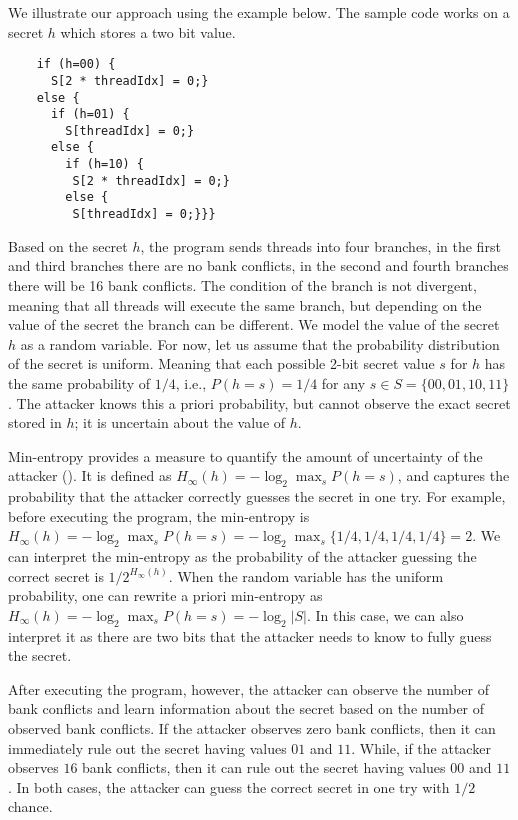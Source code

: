 We illustrate our approach using the example below.
%
The sample code works on a secret $h$ which stores a two bit value.
\begin{lstlisting}
    if (h=00) {
      S[2 * threadIdx] = 0;} 
    else {
      if (h=01) {
        S[threadIdx] = 0;}
      else {
        if (h=10) {
         S[2 * threadIdx] = 0;}
        else {
         S[threadIdx] = 0;}}}
\end{lstlisting}
Based on the secret $h$, the program sends threads into four branches, in the first and third branches there are no bank conflicts, in the second and fourth branches there will be 16 bank conflicts.
%
The condition of the branch is not divergent, meaning that all threads will execute the same branch, but depending on the value of the secret the branch can be different.
%
We model the value of the secret $h$ as a random variable.
%
For now, let us assume that the probability distribution of the secret is uniform.
%
Meaning that each possible 2-bit secret value $s$ for $h$ has the same probability of $1/4$, i.e., $P(h=s)= 1/4$ for any $s\in S=\{00,01,10,11\}$.
%
The attacker knows this a priori probability, but cannot 
observe the exact secret stored in $h$; it is uncertain about the value of $h$.
%

Min-entropy provides a measure to quantify the amount of  uncertainty of the attacker (\cite{min-entropy}).
%
It is defined as 
$H_\infty(h)=-\log_2\max_s P(h=s)$,
and captures the probability that the attacker correctly guesses the secret in one try.
%
For example, before executing the program, the min-entropy is $H_\infty(h)=-\log_2\max_s P(h=s)= - \log_2 \max_s \{1/4,1/4,1/4,1/4\}= 2$.
%
We can interpret the min-entropy as the probability of the attacker guessing the correct secret is $1/2^{H_\infty(h)}$.
%
When the random variable has the uniform probability, one can rewrite a priori min-entropy as $H_\infty(h)=-\log_2\max_s P(h=s)=-\log_2 |S|$.
%
In this case, we can also interpret it as there are two bits that the attacker needs to know to fully guess the secret.
%

After executing the program, however, the attacker can observe the number of bank conflicts and learn information about the secret based on the number of observed bank conflicts.
%
If the attacker observes zero bank conflicts, then it can immediately rule out the secret having values $01$ and $11$.
%
While, if the attacker observes $16$ bank conflicts, then it can rule out the secret having values $00$ and $11$.
%
In both cases, the attacker can guess the correct secret in one try with $1/2$ chance.
%

